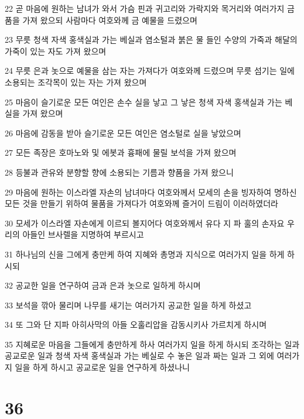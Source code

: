 \par 22 곧 마음에 원하는 남녀가 와서 가슴 핀과 귀고리와 가락지와 목거리와 여러가지 금품을 가져 왔으되 사람마다 여호와께 금 예물을 드렸으며
\par 23 무릇 청색 자색 홍색실과 가는 베실과 염소털과 붉은 물 들인 수양의 가죽과 해달의 가죽이 있는 자도 가져 왔으며
\par 24 무릇 은과 놋으로 예물을 삼는 자는 가져다가 여호와께 드렸으며 무릇 섬기는 일에 소용되는 조각목이 있는 자는 가져 왔으며
\par 25 마음이 슬기로운 모든 여인은 손수 실을 낳고 그 낳은 청색 자색 홍색실과 가는 베실을 가져 왔으며
\par 26 마음에 감동을 받아 슬기로운 모든 여인은 염소털로 실을 낳았으며
\par 27 모든 족장은 호마노와 및 에봇과 흉패에 물릴 보석을 가져 왔으며
\par 28 등불과 관유와 분향할 향에 소용되는 기름과 향품을 가져 왔으니
\par 29 마음에 원하는 이스라엘 자손의 남녀마다 여호와께서 모세의 손을 빙자하여 명하신 모든 것을 만들기 위하여 물품을 가져다가 여호와께 즐거이 드림이 이러하였더라
\par 30 모세가 이스라엘 자손에게 이르되 볼지어다 여호와께서 유다 지 파 훌의 손자요 우리의 아들인 브사렐을 지명하여 부르시고
\par 31 하나님의 신을 그에게 충만케 하여 지혜와 총명과 지식으로 여러가지 일을 하게 하시되
\par 32 공교한 일을 연구하여 금과 은과 놋으로 일하게 하시며
\par 33 보석을 깎아 물리며 나무를 새기는 여러가지 공교한 일을 하게 하셨고
\par 34 또 그와 단 지파 아히사막의 아들 오훌리압을 감동시키사 가르치게 하시며
\par 35 지혜로운 마음을 그들에게 충만하게 하사 여러가지 일을 하게 하시되 조각하는 일과 공교로운 일과 청색 자색 홍색실과 가는 베실로 수 놓은 일과 짜는 일과 그 외에 여러가지 일을 하게 하시고 공교로운 일을 연구하게 하셨나니

\chapter{36}

